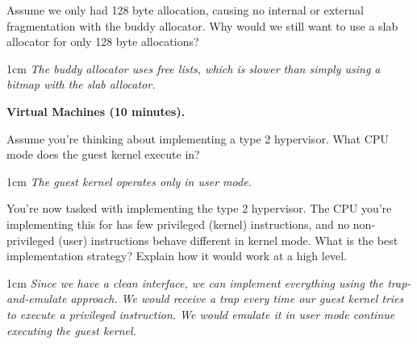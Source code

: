 \documentclass[12pt]{article}
\newenvironment{answer}{\begin{adjustwidth}{1cm}{}\itshape}{\end{adjustwidth}}
\begin{document}
\vspace{1em}

Assume we only had 128 byte allocation, causing no internal or
external fragmentation with the buddy allocator. Why would we still want to use
a slab allocator for only 128 byte allocations?

\begin{answer}
  The buddy allocator uses free lists, which is slower than simply using a
  bitmap with the slab allocator.
\end{answer}

\newpage

\textbf{Virtual Machines (10 minutes).}

\vspace{1em}

Assume you're thinking about implementing a type 2 hypervisor. What CPU mode
does the guest kernel execute in?

\begin{answer}
  The guest kernel operates only in user mode.
\end{answer}

\vspace{1em}

You're now tasked with implementing the type 2 hypervisor.
The CPU you're implementing this for has few privileged (kernel) instructions,
and no non-privileged (user)
instructions behave different in kernel mode. What is the best implementation
strategy? Explain how it would work at a high level.

\begin{answer}
  Since we have a clean interface, we can implement everything using the
  trap-and-emulate approach. We would receive a trap every time our guest kernel
  tries to execute a privileged instruction. We would emulate it in user mode
  continue executing the guest kernel.
\end{answer}
\end{document}
